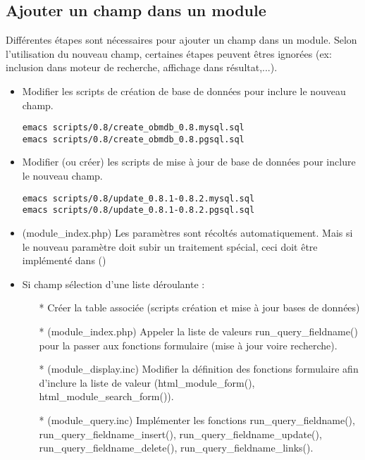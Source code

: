 

\subsection{Ajouter un champ dans un module}

Différentes étapes sont nécessaires pour ajouter un champ dans un module. Selon l'utilisation du nouveau champ, certaines étapes peuvent êtres ignorées (ex: inclusion dans moteur de recherche, affichage dans résultat,...).\\

\begin{itemize}
 \item Modifier les scripts de création de base de données pour inclure le nouveau champ.
   \begin{verbatim}
emacs scripts/0.8/create_obmdb_0.8.mysql.sql
emacs scripts/0.8/create_obmdb_0.8.pgsql.sql
   \end{verbatim}
 \item Modifier (ou créer) les scripts de mise à jour de base de données pour inclure le nouveau champ.
   \begin{verbatim}
emacs scripts/0.8/update_0.8.1-0.8.2.mysql.sql
emacs scripts/0.8/update_0.8.1-0.8.2.pgsql.sql
   \end{verbatim}
 \item (module\_index.php) Les paramètres sont récoltés automatiquement. Mais si le nouveau paramètre doit subir un traitement spécial, ceci doit être implémenté dans ()\\
 \item Si champ sélection d'une liste déroulante :
    \begin{itemize}
     \item[*] Créer la table associée (scripts création et mise à jour bases de données)\\
     \item[*] (module\_index.php) Appeler la liste de valeurs run\_query\_fieldname() pour la passer aux fonctions formulaire (mise à jour voire recherche).\\
     \item[*] (module\_display.inc) Modifier la définition des fonctions formulaire afin d'inclure la liste de valeur (html\_module\_form(), html\_module\_search\_form()).\\
     \item[*] (module\_query.inc) Implémenter les fonctions run\_query\_fieldname(), run\_query\_fieldname\_insert(), run\_query\_fieldname\_update(), run\_query\_fieldname\_delete(), run\_query\_fieldname\_links().

\end{itemize}
\end{itemize}
